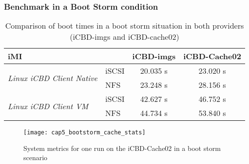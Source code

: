 \subsubsection{Benchmark in a Boot Storm condition}
\label{susub:eval_cache_bootstorm}

\begin{table}[]
\centering
\begin{tabular}{llcc}
\textbf{iMI} & \textbf{} & \textbf{iCBD-imgs} & \textbf{iCBD-Cache02} \\ \hline
\multirow{2}{*}{\textit{Linux iCBD Client Native}} & iSCSI & 20.035 s & 23.020 s \\
 & NFS & 23.248 s & 28.156 s \\ \hline
\multirow{2}{*}{\textit{Linux iCBD Client VM}} & iSCSI & 42.627 s & 46.752 s \\
 & NFS & 44.734 s & 53.840 s
\end{tabular}
	\caption{Comparison of boot times in a boot storm situation in both providers (iCBD-imgs and iCBD-cache02)}
	\label{tab:bootstorm_both}
\end{table}


\begin{figure}[htbp]
	\centering
	\texttt{[image: cap5\_bootstorm\_cache\_stats]}
	\caption{System metrics for one run on the iCBD-Cache02 in a boot storm scenario}
	\label{fig:boot_cache_stats}
\end{figure}



